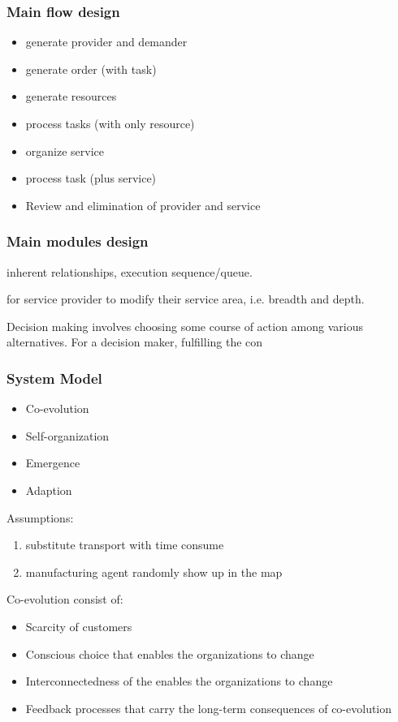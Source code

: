 \subsubsection{Main flow design} %
\label{ssub:main_flow_design}
\begin{itemize}
    \item generate provider and demander
    \item generate order (with task)
    \item generate resources
    \item process tasks (with only resource)
    \item organize service
    \item process task (plus service)
    \item Review and elimination of provider and service
\end{itemize}

\subsubsection{Main modules design}
\label{subsub:main_modules}
inherent relationships, execution sequence/queue.

for service provider to modify their service area, i.e. breadth and depth.

Decision making involves choosing some course of action among various alternatives. For a decision maker, fulfilling the con

\subsubsection{System Model}
\begin{itemize}
    \item Co-evolution
    \item Self-organization
    \item Emergence 
    \item Adaption
\end{itemize}

Assumptions:
\begin{enumerate}
    \item substitute transport with time consume
    \item manufacturing agent randomly show up in the map
\end{enumerate}

Co-evolution consist of:
\begin{itemize}
    \item Scarcity of customers
    \item Conscious choice that enables the organizations to change
    \item Interconnectedness of the enables the organizations to change
    \item Feedback processes that carry the long-term consequences of co-evolution
\end{itemize}


